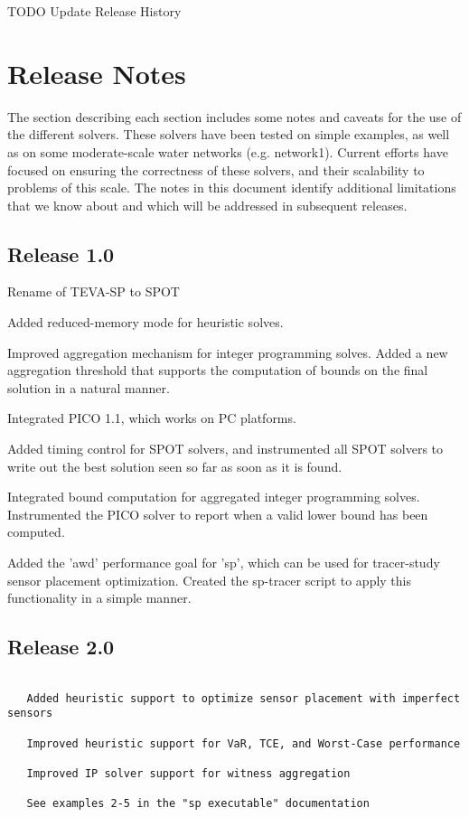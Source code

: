 TODO Update Release History

\section{Release Notes}\label{history_introNotes}
The section describing each section includes some notes and caveats for the use of the different solvers. These solvers have been tested on simple examples, as well as on some moderate-\/scale water networks (e.g. network1). Current efforts have focused on ensuring the correctness of these solvers, and their scalability to problems of this scale. The notes in this document identify additional limitations that we know about and which will be addressed in subsequent releases.

\subsection{Release 1.0}\label{history_spot1_0}

Rename of TEVA-\/SP to SPOT

Added reduced-\/memory mode for heuristic solves.

Improved aggregation mechanism for integer programming solves. Added a new aggregation threshold that supports the computation of bounds on the final solution in a natural manner.

Integrated PICO 1.1, which works on PC platforms.

Added timing control for SPOT solvers, and instrumented all SPOT solvers to write out the best solution seen so far as soon as it is found.

Integrated bound computation for aggregated integer programming solves. Instrumented the PICO solver to report when a valid lower bound has been computed.

Added the 'awd' performance goal for 'sp', which can be used for tracer-\/study sensor placement optimization. Created the sp-\/tracer script to apply this functionality in a simple manner.

\subsection{Release 2.0}\label{history_tevasp2_0}

\begin{verbatim}

   Added heuristic support to optimize sensor placement with imperfect sensors

   Improved heuristic support for VaR, TCE, and Worst-Case performance

   Improved IP solver support for witness aggregation

   See examples 2-5 in the "sp executable" documentation 
\end{verbatim}

